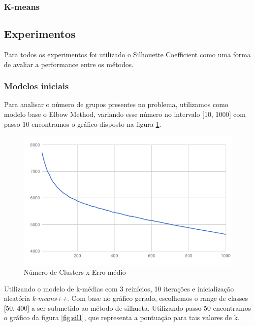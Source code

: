 \documentclass[conference]{IEEEtran}
\begin{document}
\subsubsection{K-means}


\subsection{Experimentos}
Para todos os experimentos foi utilizado o Silhouette Coefficient como uma forma de avaliar a performance entre os métodos. 

\subsubsection{Modelos iniciais}
Para analisar o número de grupos presentes no problema, utilizamos como modelo base o Elbow Method, variando esse número no intervalo [10, 1000] com passo 10 encontramos o gráfico disposto na figura \ref{fig:elbow}. 

\begin{figure}[H]
  \includegraphics[scale=0.4, center]{elbow.png}
  \caption{Número de Clusters x Erro médio}
  \label{fig:elbow}
\end{figure}

Utilizando o modelo de k-médias com 3 reinícios, 10 iterações e inicialização aleatória \textit{k-means++}. Com base no gráfico gerado, escolhemos o range de classes [50, 400] a ser submetido ao método de silhueta. Utilizando passo 50 encontramos o gráfico da figura \ref{fig:sil1}, que representa a pontuação para tais valores de k.
\end{document}
